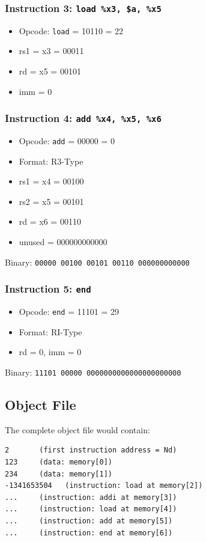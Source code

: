 \documentclass[12pt,a4paper]{article}
\begin{document}
\subsubsection{Instruction 3: \texttt{load \%x3, \$a, \%x5}}

\begin{itemize}
    \item Opcode: \texttt{load} = 10110 = 22
    \item rs1 = x3 = 00011
    \item rd = x5 = 00101
    \item imm = 0
\end{itemize}

\subsubsection{Instruction 4: \texttt{add \%x4, \%x5, \%x6}}

\begin{itemize}
    \item Opcode: \texttt{add} = 00000 = 0
    \item Format: R3-Type
    \item rs1 = x4 = 00100
    \item rs2 = x5 = 00101
    \item rd = x6 = 00110
    \item unused = 000000000000
\end{itemize}

Binary: \texttt{00000 00100 00101 00110 000000000000}

\subsubsection{Instruction 5: \texttt{end}}

\begin{itemize}
    \item Opcode: \texttt{end} = 11101 = 29
    \item Format: RI-Type
    \item rd = 0, imm = 0
\end{itemize}

Binary: \texttt{11101 00000 0000000000000000000000}

\subsection{Object File}

The complete object file would contain:
\begin{verbatim}
2       (first instruction address = Nd)
123     (data: memory[0])
234     (data: memory[1])
-1341653504   (instruction: load at memory[2])
...     (instruction: addi at memory[3])
...     (instruction: load at memory[4])
...     (instruction: add at memory[5])
...     (instruction: end at memory[6])
\end{verbatim}
\end{document}
